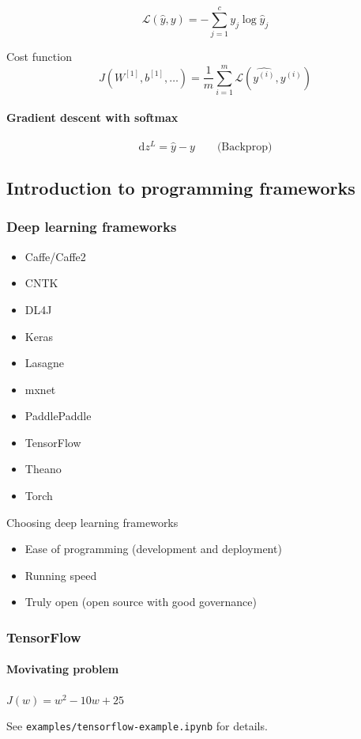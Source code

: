 \documentclass[UTF8]{article}
\newcommand{\Vector}[1]{\boldsymbol{\mathit{#1}}}   %
\newcommand{\Matrix}[1]{\boldsymbol{\mathit{#1}}}   %
\newcommand{\Cal}[1]{\mathcal{#1}}                  %
\begin{document}
$$ \Cal{L}(\hat{\Vector{y}}, \Vector{y}) = - \sum_{j=1}^c \Vector{y}_j \log \hat{\Vector{y}}_j $$

Cost function
$$ J(\Matrix{W^{[1]}}, \Vector{b^{[1]}}, \ldots)
= \frac{1}{m} \sum_{i=1}^m \Cal{L}(\hat{\Vector{y^{(i)}}}, \Vector{y^{(i)}}) $$

\paragraph{Gradient descent with softmax}
$$ \text{d}\Vector{z^{L}} = \hat{\Vector{y}} - \Vector{y} \qquad \text{(Backprop)}$$

\subsection{Introduction to programming frameworks}
\subsubsection{Deep learning frameworks}
\begin{itemize}
    \item Caffe/Caffe2
    \item CNTK
    \item DL4J
    \item Keras
    \item Lasagne
    \item mxnet
    \item PaddlePaddle
    \item TensorFlow
    \item Theano
    \item Torch
\end{itemize}

Choosing deep learning frameworks
\begin{itemize}
    \item Ease of programming (development and deployment)
    \item Running speed
    \item Truly open (open source with good governance)
\end{itemize}

\subsubsection{TensorFlow}
\paragraph{Movivating problem} $ J(w) = w^2 - 10w + 25 $

See \texttt{examples/tensorflow-example.ipynb} for details.
\end{document}

